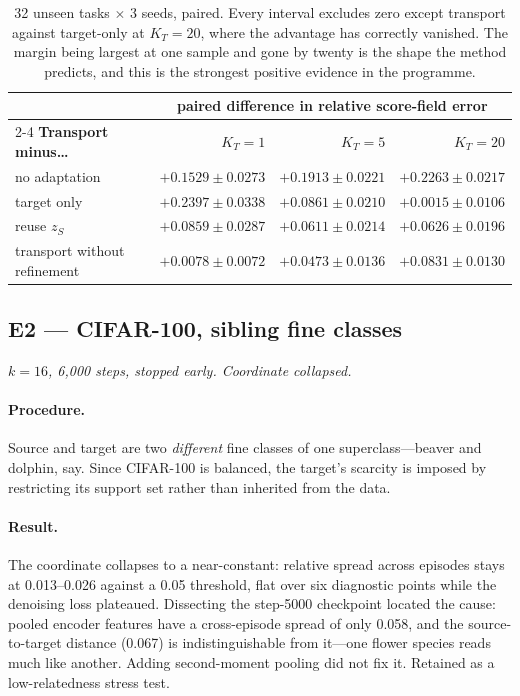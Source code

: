 \documentclass[11pt]{article}
\newcommand{\KT}{K_{T}}
\newcommand{\zS}{z_{S}}
\begin{document}
\begin{table}[htbp]
\centering\small
\begin{tabular}{@{}lrrr@{}}
\toprule
& \multicolumn{3}{c}{paired difference in relative score-field error} \\
\cmidrule(lr){2-4}
\textbf{Transport minus\ldots} & $\KT=1$ & $\KT=5$ & $\KT=20$ \\
\midrule
no adaptation              & $+0.1529\pm0.0273$ & $+0.1913\pm0.0221$ & $+0.2263\pm0.0217$ \\
target only                & $+0.2397\pm0.0338$ & $+0.0861\pm0.0210$ & $+0.0015\pm0.0106$ \\
reuse $\zS$                & $+0.0859\pm0.0287$ & $+0.0611\pm0.0214$ & $+0.0626\pm0.0196$ \\
transport without refinement & $+0.0078\pm0.0072$ & $+0.0473\pm0.0136$ & $+0.0831\pm0.0130$ \\
\bottomrule
\end{tabular}
\caption{32 unseen tasks $\times$ 3 seeds, paired. Every interval excludes zero except transport
against target-only at $\KT=20$, where the advantage has correctly vanished. The margin being
largest at one sample and gone by twenty is the shape the method predicts, and this is the
strongest positive evidence in the programme.}
\end{table}

\subsection{E2 --- CIFAR-100, sibling fine classes}

\textit{$k=16$, 6{,}000 steps, stopped early. Coordinate collapsed.}

\paragraph{Procedure.} Source and target are two \emph{different} fine classes of one
superclass---beaver and dolphin, say. Since CIFAR-100 is balanced, the target's scarcity is imposed
by restricting its support set rather than inherited from the data.

\paragraph{Result.} The coordinate collapses to a near-constant: relative spread across episodes
stays at 0.013--0.026 against a 0.05 threshold, flat over six diagnostic points while the denoising
loss plateaued. Dissecting the step-5000 checkpoint located the cause: pooled encoder features have
a cross-episode spread of only 0.058, and the source-to-target distance (0.067) is indistinguishable
from it---one flower species reads much like another. Adding second-moment pooling did not fix it.
Retained as a low-relatedness stress test.
\end{document}

